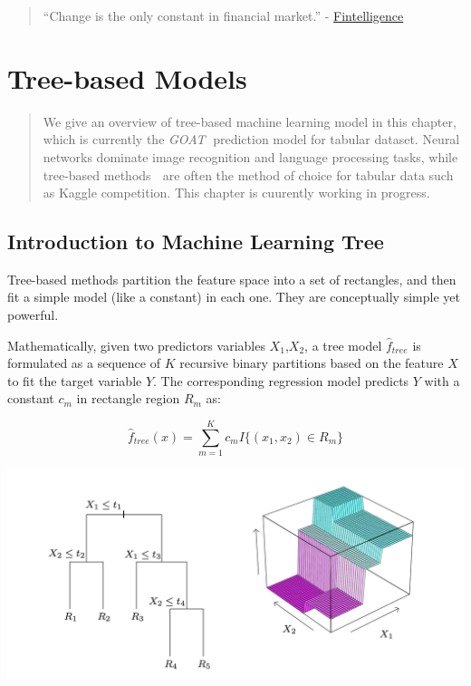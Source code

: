 \documentclass[
]{book}
\begin{document}
\begin{quote}
``Change is the only constant in financial market.'' - \href{https://fintelligence-academy.github.io}{Fintelligence}
\end{quote}

\hypertarget{tree-based-models}{%
\chapter{Tree-based Models}\label{tree-based-models}}

\begin{quote}
We give an overview of tree-based machine learning model in this chapter, which is currently the \emph{GOAT}🐐 prediction model for tabular dataset. Neural networks dominate image recognition and language processing tasks, while tree-based methods 🌲 are often the method of choice for tabular data such as Kaggle competition. This chapter is cuurently working in progress.
\end{quote}

\hypertarget{introduction-to-machine-learning-tree}{%
\section{Introduction to Machine Learning Tree 🌲}\label{introduction-to-machine-learning-tree}}

Tree-based methods partition the feature space into a set of rectangles, and then fit a simple model (like a constant) in each one. They are conceptually simple yet powerful.

Mathematically, given two predictors variables \(X_1\),\(X_2\), a tree model \(\hat{f}_{tree}\) is formulated as a sequence of \(K\) recursive binary partitions based on the feature \(X\) to fit the target variable \(Y\). The corresponding regression model predicts \(Y\) with a constant \(c_m\) in rectangle region \(R_m\) as:

\[
\hat{f}_{tree} (x) = \sum_{m=1}^K c_m I\{ (x_1, x_2) \in R_m \} 
\]

\includegraphics[width=1\linewidth]{images/chapter4/simple_tree}
\end{document}
